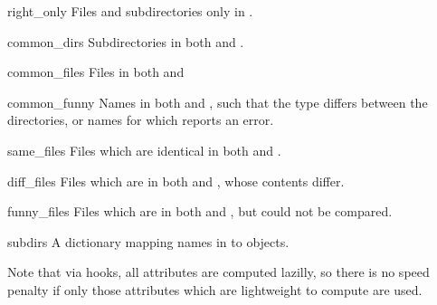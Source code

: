 \begin{memberdesc}[dircmp]{right_only}
Files and subdirectories only in .
\end{memberdesc}

\begin{memberdesc}[dircmp]{common_dirs}
Subdirectories in both  and .
\end{memberdesc}

\begin{memberdesc}[dircmp]{common_files}
Files in both  and 
\end{memberdesc}

\begin{memberdesc}[dircmp]{common_funny}
Names in both  and , such that the type differs between
the directories, or names for which  reports an
error.
\end{memberdesc}

\begin{memberdesc}[dircmp]{same_files}
Files which are identical in both  and .
\end{memberdesc}

\begin{memberdesc}[dircmp]{diff_files}
Files which are in both  and , whose contents differ.
\end{memberdesc}

\begin{memberdesc}[dircmp]{funny_files}
Files which are in both  and , but could not be
compared.
\end{memberdesc}

\begin{memberdesc}[dircmp]{subdirs}
A dictionary mapping names in  to
 objects.
\end{memberdesc}

Note that via  hooks, all attributes are
computed lazilly, so there is no speed penalty if only those
attributes which are lightweight to compute are used.
